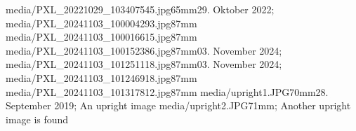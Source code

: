   {media/PXL_20221029_103407545.jpg}{65mm}{29. Oktober 2022; }
\clearpage  %
\photoNouveauN
  {media/PXL_20241103_100004293.jpg}{87mm}{}
  {media/PXL_20241103_100016615.jpg}{87mm}{}
\photoNouveauN
  {media/PXL_20241103_100152386.jpg}{87mm}{03. November 2024; }
  {media/PXL_20241103_101251118.jpg}{87mm}{03. November 2024; }
\clearpage  %
\photoNouveauN
  {media/PXL_20241103_101246918.jpg}{87mm}{}
  {}{}{}
\clearpage  %
\photoNouveauN
  {media/PXL_20241103_101317812.jpg}{87mm}{}
  {media/upright1.JPG}{70mm}{28. September 2019; An upright image}
\photoNouveauN
  {media/upright2.JPG}{71mm}{; Another upright image is found}
  {}{}{}
